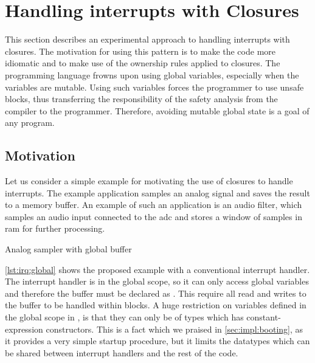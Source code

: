 
\section{Handling interrupts with Closures}
\label{sec:irq-closures}

This section describes an experimental approach to handling interrupts with closures.
The motivation for using this pattern is to make the code more {\rust} idiomatic and to make use of the ownership rules applied to closures.
The {\rust} programming language frowns upon using global variables, especially when the variables are mutable.
Using such variables forces the programmer to use unsafe blocks, thus transferring the responsibility of the safety analysis from the compiler to the programmer.
Therefore, avoiding mutable global state is a goal of any {\rust} program.

\subsection{Motivation}
\label{sec:irq:motivation}

Let us consider a simple example for motivating the use of closures to handle interrupts.
The example application samples an analog signal and saves the result to a memory buffer.
An example of such an application is an audio filter, which samples an audio input connected to the \gls{adc} and stores a window of samples in \gls{ram} for further processing.

\begin{listing}[H]
  \caption{Analog sampler with global buffer}
  \label{lst:irq:global}
\end{listing}

\autoref{lst:irq:global} shows the proposed example with a conventional interrupt handler.
The interrupt handler is in the global scope, so it can only access global variables and therefore the buffer must be declared as .
This require all read and writes to the buffer to be handled within  blocks.
A huge restriction on variables defined in the global scope in {\rust}, is that they can only be of types which has constant-expression constructors.
This is a fact which we praised in \autoref{sec:impl:booting}, as it provides a very simple startup procedure, but it limits the datatypes which can be shared between interrupt handlers and the rest of the code.


